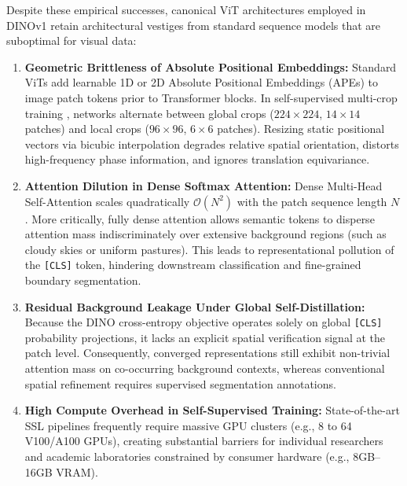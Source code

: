 \documentclass[11pt,a4paper]{article}
\begin{document}
Despite these empirical successes, canonical ViT architectures employed in DINOv1 retain architectural vestiges from standard sequence models that are suboptimal for visual data:
\begin{enumerate}[leftmargin=*]
    \item \textbf{Geometric Brittleness of Absolute Positional Embeddings:} Standard ViTs add learnable 1D or 2D Absolute Positional Embeddings (APEs) to image patch tokens prior to Transformer blocks. In self-supervised multi-crop training \cite{caron2020swav, caron2021emerging}, networks alternate between global crops ($224 \times 224$, $14 \times 14$ patches) and local crops ($96 \times 96$, $6 \times 6$ patches). Resizing static positional vectors via bicubic interpolation degrades relative spatial orientation, distorts high-frequency phase information, and ignores translation equivariance.
    \item \textbf{Attention Dilution in Dense Softmax Attention:} Dense Multi-Head Self-Attention scales quadratically $\mathcal{O}(N^2)$ with the patch sequence length $N$. More critically, fully dense attention allows semantic tokens to disperse attention mass indiscriminately over extensive background regions (such as cloudy skies or uniform pastures). This leads to representational pollution of the \texttt{[CLS]} token, hindering downstream classification and fine-grained boundary segmentation.
    \item \textbf{Residual Background Leakage Under Global Self-Distillation:} Because the DINO cross-entropy objective operates solely on global \texttt{[CLS]} probability projections, it lacks an explicit spatial verification signal at the patch level. Consequently, converged representations still exhibit non-trivial attention mass on co-occurring background contexts, whereas conventional spatial refinement requires supervised segmentation annotations.
    \item \textbf{High Compute Overhead in Self-Supervised Training:} State-of-the-art SSL pipelines frequently require massive GPU clusters (e.g., 8 to 64 V100/A100 GPUs), creating substantial barriers for individual researchers and academic laboratories constrained by consumer hardware (e.g., 8GB--16GB VRAM).
\end{enumerate}
\end{document}
